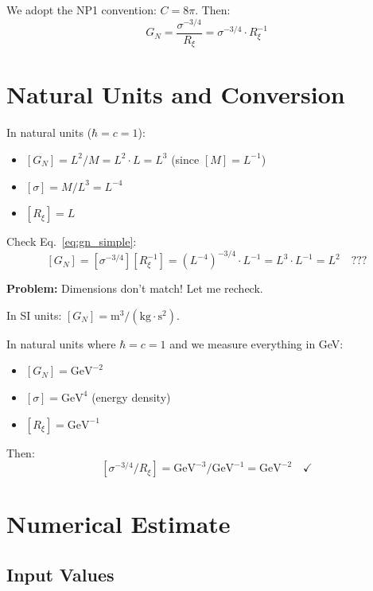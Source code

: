 \documentclass[11pt,a4paper]{article}
\begin{document}
We adopt the NP1 convention: $C = 8\pi$. Then:
\begin{equation}
G_N = \frac{\sigma^{-3/4}}{R_\xi} = \sigma^{-3/4} \cdot R_\xi^{-1}
\label{eq:gn_simple}
\end{equation}

\section{Natural Units and Conversion}

In natural units ($\hbar = c = 1$):
\begin{itemize}
\item $[G_N] = L^2 / M = L^2 \cdot L = L^3$ (since $[M] = L^{-1}$)
\item $[\sigma] = M / L^3 = L^{-4}$
\item $[R_\xi] = L$
\end{itemize}

Check Eq.~\eqref{eq:gn_simple}:
\[
[G_N] = [\sigma^{-3/4}][R_\xi^{-1}] = (L^{-4})^{-3/4} \cdot L^{-1}
= L^3 \cdot L^{-1} = L^2 \quad \text{???}
\]

\textbf{Problem:} Dimensions don't match! Let me recheck.

In SI units: $[G_N] = \text{m}^3 / (\text{kg} \cdot \text{s}^2)$.

In natural units where $\hbar = c = 1$ and we measure everything in GeV:
\begin{itemize}
\item $[G_N] = \text{GeV}^{-2}$
\item $[\sigma] = \text{GeV}^4$ (energy density)
\item $[R_\xi] = \text{GeV}^{-1}$
\end{itemize}

Then:
\[
[\sigma^{-3/4} / R_\xi] = \text{GeV}^{-3} / \text{GeV}^{-1} = \text{GeV}^{-2}
\quad \checkmark
\]

\section{Numerical Estimate}

\subsection{Input Values}
\end{document}
